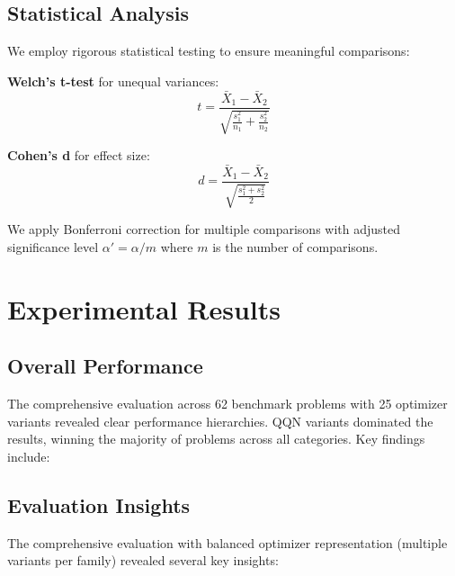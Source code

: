 \hypertarget{statistical-analysis}{%
\subsection{Statistical Analysis}\label{statistical-analysis}}

We employ rigorous statistical testing to ensure meaningful comparisons:

\textbf{Welch's t-test} for unequal variances:
\[t = \frac{\bar{X}_1 - \bar{X}_2}{\sqrt{\frac{s_1^2}{n_1} + \frac{s_2^2}{n_2}}}\]

\textbf{Cohen's d} for effect size:
\[d = \frac{\bar{X}_1 - \bar{X}_2}{\sqrt{\frac{s_1^2 + s_2^2}{2}}}\]

We apply Bonferroni correction for multiple comparisons with adjusted significance level \(\alpha' = \alpha / m\) where \(m\) is the number of comparisons.

\hypertarget{experimental-results}{%
\section{Experimental Results}\label{experimental-results}}

\hypertarget{overall-performance}{%
\subsection{Overall Performance}\label{overall-performance}}

The comprehensive evaluation across 62 benchmark problems with 25 optimizer variants revealed clear performance hierarchies. QQN variants dominated the results, winning the majority of problems across all categories. Key findings include:

\hypertarget{evaluation-insights}{%
\subsection{Evaluation Insights}\label{evaluation-insights}}

The comprehensive evaluation with balanced optimizer representation (multiple variants per family) revealed several key insights:

